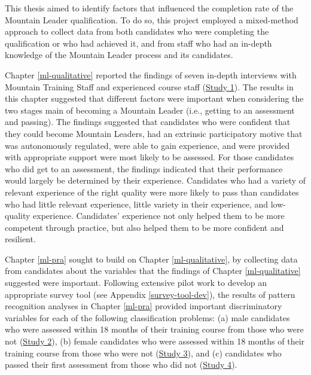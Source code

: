 \documentclass[
  12pt,
  a4paper,
]{book}
\begin{document}
This thesis aimed to identify factors that influenced the completion rate of the Mountain Leader qualification. To do so, this project employed a mixed-method approach to collect data from both candidates who were completing the qualification or who had achieved it, and from staff who had an in-depth knowledge of the Mountain Leader process and its candidates.

Chapter \ref{ml-qualitative} reported the findings of seven in-depth interviews with Mountain Training Staff and experienced course staff (\protect\hyperlink{ml-qualitative}{Study 1}). The results in this chapter suggested that different factors were important when considering the two stages main of becoming a Mountain Leader (i.e., getting to an assessment and passing). The findings suggested that candidates who were confident that they could become Mountain Leaders, had an extrinsic participatory motive that was autonomously regulated, were able to gain experience, and were provided with appropriate support were most likely to be assessed. For those candidates who did get to an assessment, the findings indicated that their performance would largely be determined by their experience. Candidates who had a variety of relevant experience of the right quality were more likely to pass than candidates who had little relevant experience, little variety in their experience, and low-quality experience. Candidates' experience not only helped them to be more competent through practice, but also helped them to be more confident and resilient.

Chapter \ref{ml-pra} sought to build on Chapter \ref{ml-qualitative}, by collecting data from candidates about the variables that the findings of Chapter \ref{ml-qualitative} suggested were important. Following extensive pilot work to develop an appropriate survey tool (see Appendix \ref{survey-tool-dev}), the results of pattern recognition analyses in Chapter \ref{ml-pra} provided important discriminatory variables for each of the following classification problems: (a) male candidates who were assessed within 18 months of their training course from those who were not (\protect\hyperlink{male-gta}{Study 2}), (b) female candidates who were assessed within 18 months of their training course from those who were not (\protect\hyperlink{female-gta}{Study 3}), and (c) candidates who passed their first assessment from those who did not (\protect\hyperlink{ftp}{Study 4}).
\end{document}
